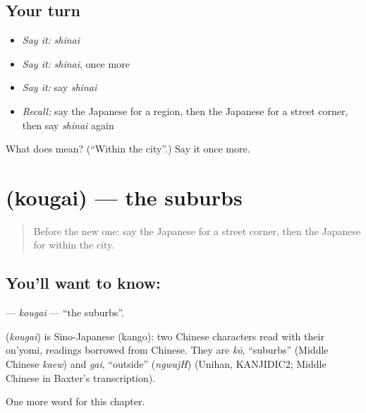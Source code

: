 \subsection*{Your turn}
\begin{itemize}
\raggedright
  \item \emph{Say it:} \emph{shinai}
  \item \emph{Say it:} \emph{shinai}, once more
  \item \emph{Say it:} say \emph{shinai}
  \item \emph{Recall:} say the Japanese for a region, then the Japanese for a street corner, then say \emph{shinai} again
\end{itemize}

\begin{tcolorbox}[breakable,colback=teal!4,colframe=teal!35!black,title={Before you move on}]
What does  mean? (\textquotedblleft{}Within the city\textquotedblright{}.) Say it once more.
\end{tcolorbox}
\section[\texorpdfstring{\ja{こうがい} (kougai)}{こうがい (kougai)}]{ (kougai) — the suburbs}

\label{lesson:JA-C82-kougai}



\begin{quote}
Before the new one: say the Japanese for a street corner, then the Japanese for within the city.
\end{quote}

\subsection*{You'll want to know: }
\textbf{} — \emph{kougai} — \textquotedblleft{}the suburbs\textquotedblright{}.

\begin{cousinweb}
\textbf{} (\emph{kougai}) is Sino-Japanese (kango): two Chinese characters read with their on'yomi, readings borrowed from Chinese. They are \emph{kō}, \textquotedblleft{}suburbs\textquotedblright{} (Middle Chinese \emph{kaew}) and \emph{gai}, \textquotedblleft{}outside\textquotedblright{} (\emph{ngwajH}) (Unihan, KANJIDIC2; Middle Chinese in Baxter's transcription).
\end{cousinweb}

\begin{grammarlens}[title={What you've built}]
One more word for this chapter.
\end{grammarlens}

